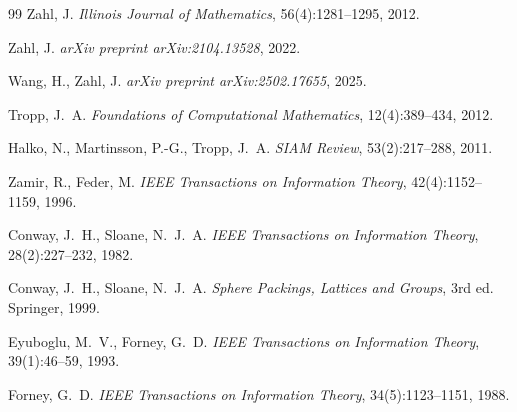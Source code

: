 \documentclass[10pt,a4paper]{article}
\theoremstyle{definition}
\theoremstyle{plain}
\newcommand{\R}{\mathbb{R}}
\begin{document}
\begin{thebibliography}{99}
Zahl, J.
\newblock \emph{Illinois Journal of Mathematics}, 56(4):1281--1295, 2012.

Zahl, J.
\newblock {A new bound on Kakeya sets in $\R^3$.}
\newblock \emph{arXiv preprint arXiv:2104.13528}, 2022.

Wang, H., Zahl, J.
\newblock \emph{arXiv preprint arXiv:2502.17655}, 2025.


Tropp, J.~A.
\newblock \emph{Foundations of Computational Mathematics}, 12(4):389--434, 2012.

Halko, N., Martinsson, P.-G., Tropp, J.~A.
\newblock \emph{SIAM Review}, 53(2):217--288, 2011.


Zamir, R., Feder, M.
\newblock \emph{IEEE Transactions on Information Theory}, 42(4):1152--1159, 1996.

Conway, J.~H., Sloane, N.~J.~A.
\newblock \emph{IEEE Transactions on Information Theory}, 28(2):227--232, 1982.

Conway, J.~H., Sloane, N.~J.~A.
\newblock \emph{Sphere Packings, Lattices and Groups}, 3rd ed.
\newblock Springer, 1999.

Eyuboglu, M.~V., Forney, G.~D.
\newblock \emph{IEEE Transactions on Information Theory}, 39(1):46--59, 1993.

Forney, G.~D.
\newblock \emph{IEEE Transactions on Information Theory}, 34(5):1123--1151, 1988.


\end{thebibliography}
\end{document}

